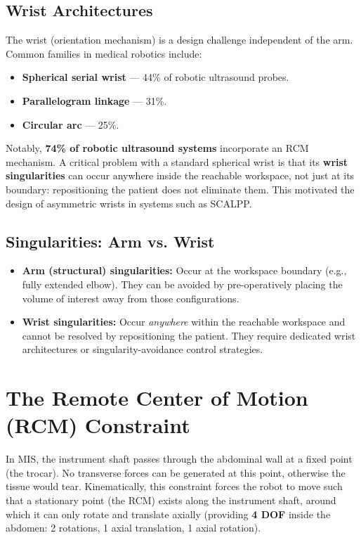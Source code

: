 \documentclass[11pt,a4paper,twoside]{report}
\begin{document}
\subsection{Wrist Architectures}
The wrist (orientation mechanism) is a design challenge independent of the arm. Common families in medical robotics include:
\begin{itemize}
    \item \textbf{Spherical serial wrist} — 44\% of robotic ultrasound probes.
    \item \textbf{Parallelogram linkage} — 31\%.
    \item \textbf{Circular arc} — 25\%.
\end{itemize}
Notably, \textbf{74\% of robotic ultrasound systems} incorporate an RCM mechanism. A critical problem with a standard spherical wrist is that its \textbf{wrist singularities} can occur anywhere inside the reachable workspace, not just at its boundary: repositioning the patient does not eliminate them. This motivated the design of asymmetric wrists in systems such as SCALPP.

\subsection{Singularities: Arm vs. Wrist}
\begin{itemize}
    \item \textbf{Arm (structural) singularities:} Occur at the workspace boundary (e.g., fully extended elbow). They can be avoided by pre-operatively placing the volume of interest away from those configurations.
    \item \textbf{Wrist singularities:} Occur \textit{anywhere} within the reachable workspace and cannot be resolved by repositioning the patient. They require dedicated wrist architectures or singularity-avoidance control strategies.
\end{itemize}

\section{The Remote Center of Motion (RCM) Constraint}
In MIS, the instrument shaft passes through the abdominal wall at a fixed point (the trocar). No transverse forces can be generated at this point, otherwise the tissue would tear. Kinematically, this constraint forces the robot to move such that a stationary point (the RCM) exists along the instrument shaft, around which it can only rotate and translate axially (providing \textbf{4 DOF} inside the abdomen: 2 rotations, 1 axial translation, 1 axial rotation).
\end{document}
